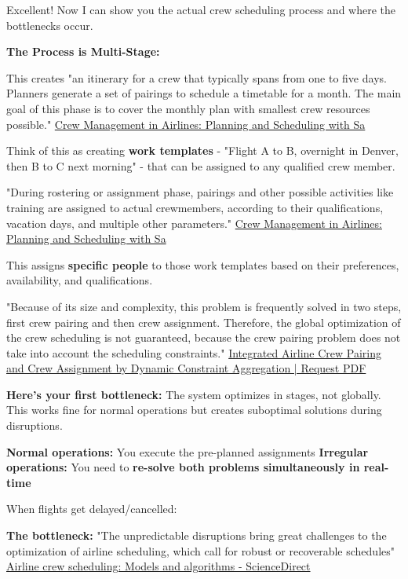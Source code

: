 \begin{botresponse}
Excellent! Now I can show you the actual crew scheduling process and where the bottlenecks occur.

\textbf{The Process is Multi-Stage:}

This creates "an itinerary for a crew that typically spans from one to five days. Planners generate a set of pairings to schedule a timetable for a month. The main goal of this phase is to cover the monthly plan with smallest crew resources possible." \href{https://www.altexsoft.com/blog/crew-management-system-in-airlines/}{Crew Management in Airlines: Planning and Scheduling with Sa}

Think of this as creating \textbf{work templates} - "Flight A to B, overnight in Denver, then B to C next morning" - that can be assigned to any qualified crew member.

"During rostering or assignment phase, pairings and other possible activities like training are assigned to actual crewmembers, according to their qualifications, vacation days, and multiple other parameters." \href{https://www.altexsoft.com/blog/crew-management-system-in-airlines/}{Crew Management in Airlines: Planning and Scheduling with Sa}

This assigns \textbf{specific people} to those work templates based on their preferences, availability, and qualifications.

"Because of its size and complexity, this problem is frequently solved in two steps, first crew pairing and then crew assignment. Therefore, the global optimization of the crew scheduling is not guaranteed, because the crew pairing problem does not take into account the scheduling constraints." \href{https://www.researchgate.net/publication/262281199_Integrated_Airline_Crew_Pairing_and_Crew_Assignment_by_Dynamic_Constraint_Aggregation}{Integrated Airline Crew Pairing and Crew Assignment by Dynamic Constraint Aggregation | Request PDF}

\textbf{Here's your first bottleneck:} The system optimizes in stages, not globally. This works fine for normal operations but creates suboptimal solutions during disruptions.

\textbf{Normal operations:} You execute the pre-planned assignments \textbf{Irregular operations:} You need to \textbf{re-solve both problems simultaneously in real-time}

When flights get delayed/cancelled:

\textbf{The bottleneck:} "The unpredictable disruptions bring great challenges to the optimization of airline scheduling, which call for robust or recoverable schedules" \href{https://www.sciencedirect.com/science/article/abs/pii/S1366554521000788}{Airline crew scheduling: Models and algorithms - ScienceDirect}


\end{botresponse}
